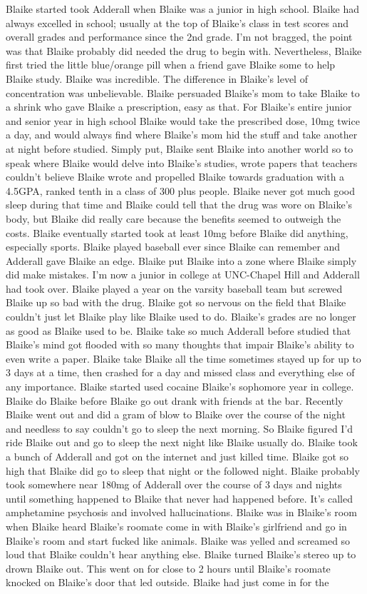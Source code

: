 \documentclass[12pt]{book}
\begin{document}
Blaike started took Adderall when Blaike was a junior in high school. Blaike had always excelled in school; usually at the top of Blaike's class in test scores and overall grades and performance since the 2nd grade. I'm not bragged, the point was that Blaike probably did needed the drug to begin with. Nevertheless, Blaike first tried the little blue/orange pill when a friend gave Blaike some to help Blaike study. Blaike was incredible. The difference in Blaike's level of concentration was unbelievable. Blaike persuaded Blaike's mom to take Blaike to a shrink who gave Blaike a prescription, easy as that. For Blaike's entire junior and senior year in high school Blaike would take the prescribed dose, 10mg twice a day, and would always find where Blaike's mom hid the stuff and take another at night before studied. Simply put, Blaike sent Blaike into another world so to speak where Blaike would delve into Blaike's studies, wrote papers that teachers couldn't believe Blaike wrote and propelled Blaike towards graduation with a 4.5GPA, ranked tenth in a class of 300 plus people. Blaike never got much good sleep during that time and Blaike could tell that the drug was wore on Blaike's body, but Blaike did really care because the benefits seemed to outweigh the costs. Blaike eventually started took at least 10mg before Blaike did anything, especially sports. Blaike played baseball ever since Blaike can remember and Adderall gave Blaike an edge. Blaike put Blaike into a zone where Blaike simply did make mistakes. I'm now a junior in college at UNC-Chapel Hill and Adderall had took over. Blaike played a year on the varsity baseball team but screwed Blaike up so bad with the drug. Blaike got so nervous on the field that Blaike couldn't just let Blaike play like Blaike used to do. Blaike's grades are no longer as good as Blaike used to be. Blaike take so much Adderall before studied that Blaike's mind got flooded with so many thoughts that impair Blaike's ability to even write a paper. Blaike take Blaike all the time sometimes stayed up for up to 3 days at a time, then crashed for a day and missed class and everything else of any importance. Blaike started used cocaine Blaike's sophomore year in college. Blaike do Blaike before Blaike go out drank with friends at the bar. Recently Blaike went out and did a gram of blow to Blaike over the course of the night and needless to say couldn't go to sleep the next morning. So Blaike figured I'd ride Blaike out and go to sleep the next night like Blaike usually do. Blaike took a bunch of Adderall and got on the internet and just killed time. Blaike got so high that Blaike did go to sleep that night or the followed night. Blaike probably took somewhere near 180mg of Adderall over the course of 3 days and nights until something happened to Blaike that never had happened before. It's called amphetamine psychosis and involved hallucinations. Blaike was in Blaike's room when Blaike heard Blaike's roomate come in with Blaike's girlfriend and go in Blaike's room and start fucked like animals. Blaike was yelled and screamed so loud that Blaike couldn't hear anything else. Blaike turned Blaike's stereo up to drown Blaike out. This went on for close to 2 hours until Blaike's roomate knocked on Blaike's door that led outside. Blaike had just come in for the 
\end{document}
